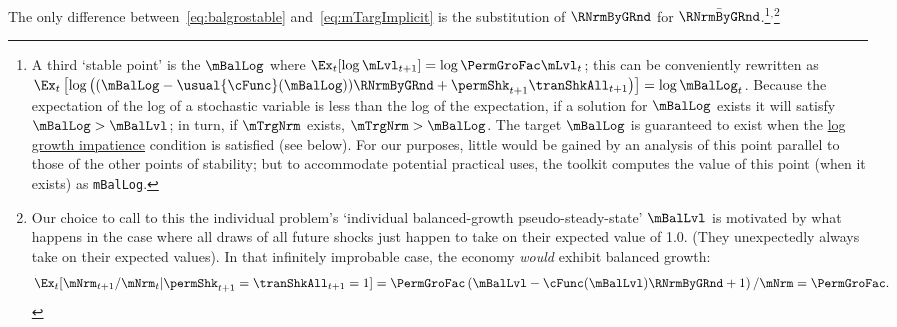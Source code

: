 \documentclass[BufferStockTheory]{subfiles}
\begin{document}
The only difference between~\eqref{eq:balgrostable} and~\eqref{eq:mTargImplicit} is the substitution of $\RNrmByGRnd$ for $\bar{\RNrmByGRnd}$.\footnote{A third `stable point' is the $\mBalLog$ where $\Ex_{t}[\log \mLvl_{t+1}] = \log \PermGroFac \mLvl_{t}$; this can be conveniently rewritten as $\Ex_{t}\left[\log\left((\mBalLog-\usual{\cFunc}(\mBalLog))\RNrmByGRnd+\permShk_{t+1}\tranShkAll_{t+1}\right)\right]  = \log \mBalLog_{t}$.
Because the expectation of the log of a stochastic variable is less than the log of the expectation, if a solution for $\mBalLog$ exists it will satisfy $\mBalLog > \mBalLvl$; in turn, if $\mTrgNrm$ exists, $\mTrgNrm>\mBalLog$.
The target $\mBalLog$ is guaranteed to exist when the \hyperlink{GICSdl}{log growth impatience} condition is satisfied (see below).
For our purposes, little would be gained by an analysis of this point parallel to those of the other points of stability; but to accommodate potential practical uses,  the {\ARKurl} toolkit computes the value of this point (when it exists) as \texttt{mBalLog}.}$^{,}$\footnote{Our choice to call to this the individual problem's `individual balanced-growth pseudo-steady-state' $\mBalLvl$ is motivated by what happens in the case where all draws of all future shocks just happen to take on their expected value of 1.0.
(They unexpectedly always take on their expected values).
In that infinitely improbable case, the economy \textit{would} exhibit balanced growth:
  \begin{align*}
    \Ex_{t}[\mNrm_{t+1}/\mNrm_{t}|\permShk_{t+1}=\tranShkAll_{t+1}=1] = \PermGroFac \left(\mBalLvl-\cFunc(\mBalLvl)\RNrmByGRnd + 1 \right)/\mNrm = \PermGroFac.
  \end{align*}}
\end{document}

